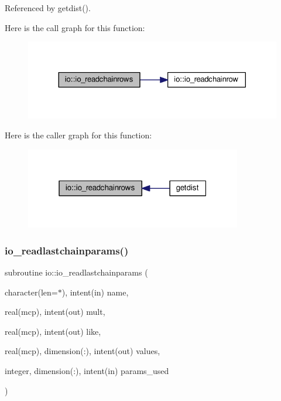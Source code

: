 Referenced by getdist().

Here is the call graph for this function\+:
\nopagebreak
\begin{figure}[H]
\begin{center}
\leavevmode
\includegraphics[width=324pt]{namespaceio_af9199bcf411dd77ceb40961983436c41_cgraph}
\end{center}
\end{figure}
Here is the caller graph for this function\+:
\nopagebreak
\begin{figure}[H]
\begin{center}
\leavevmode
\includegraphics[width=268pt]{namespaceio_af9199bcf411dd77ceb40961983436c41_icgraph}
\end{center}
\end{figure}
\mbox{\label{namespaceio_a9de0b570ee4f35ba8e729e08cd26f7fe}} 
\subsubsection{\texorpdfstring{io\+\_\+readlastchainparams()}{io\_readlastchainparams()}}
{\footnotesize\ttfamily subroutine io\+::io\+\_\+readlastchainparams (\begin{DoxyParamCaption}\item[{character(len=$\ast$), intent(in)}]{name,  }\item[{real(mcp), intent(out)}]{mult,  }\item[{real(mcp), intent(out)}]{like,  }\item[{real(mcp), dimension(\+:), intent(out)}]{values,  }\item[{integer, dimension(\+:), intent(in)}]{params\+\_\+used }\end{DoxyParamCaption})}



